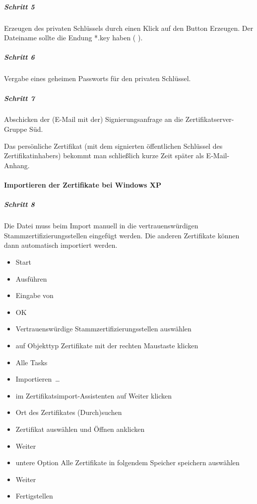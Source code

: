 \subparagraph{Schritt 5}

Erzeugen des privaten Schlüssels durch einen Klick auf den Button \glqq{}Erzeugen\grqq{}.
Der Dateiname sollte die Endung *.key haben (\zB{} ).

\subparagraph{Schritt 6}

Vergabe eines geheimen Passworts für den privaten Schlüssel.

\subparagraph{Schritt 7}

Abschicken der (E-Mail mit der) Signierungsanfrage an die
Zertifikatserver-Gruppe Süd.

Das persönliche Zertifikat (mit dem signierten öffentlichen Schlüssel des
Zertifikatinhabers) bekommt man schließlich kurze Zeit später als E-Mail-Anhang.

\paragraph{Importieren der Zertifikate bei Windows XP}

\subparagraph{Schritt 8}

Die Datei  muss beim Import manuell in die
vertrauenswürdigen Stammzertifizierungsstellen eingefügt werden. Die anderen
Zertifikate können dann automatisch importiert werden.

\begin{itemize}
  \item \glqq{}Start\grqq{}
  \item \glqq{}Ausführen\grqq{}
  \item Eingabe von 
  \item \glqq{}OK\grqq{}
  \item \glqq{}Vertrauenswürdige Stammzertifizierungsstellen\grqq{} auswählen
  \item auf Objekttyp \glqq{}Zertifikate\grqq{} mit der rechten Maustaste klicken
  \item \glqq{}Alle Tasks\grqq{}
  \item \glqq{}Importieren~\dots\grqq{} 
  \item im Zertifikatsimport-Assistenten auf \glqq{}Weiter\grqq{} klicken
  \item Ort des Zertifikates \glqq{}(Durch)suchen\grqq{}
  \item Zertifikat auswählen und \glqq{}Öffnen\grqq{} anklicken
  \item \glqq{}Weiter\grqq{}
  \item untere Option \glqq{}Alle Zertifikate in folgendem Speicher speichern\grqq{} auswählen
  \item \glqq{}Weiter\grqq{}
  \item \glqq{}Fertigstellen\grqq{}
\end{itemize}

